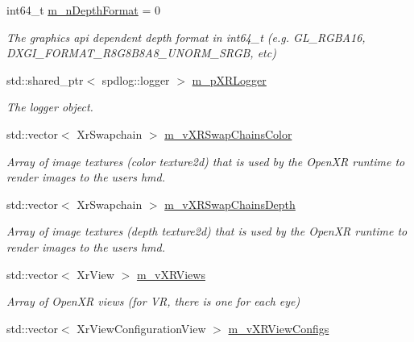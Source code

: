 \begin{DoxyCompactItemize}
int64\+\_\+t \mbox{\hyperlink{class_open_x_r_provider_1_1_x_r_render_manager_a103132b67fa308994833d7f4b3d874d7}{m\+\_\+n\+Depth\+Format}} = 0
\begin{DoxyCompactList}\small\item\em The graphics api dependent depth format in int64\+\_\+t (e.\+g. G\+L\+\_\+\+R\+G\+B\+A16, D\+X\+G\+I\+\_\+\+F\+O\+R\+M\+A\+T\+\_\+\+R8\+G8\+B8\+A8\+\_\+\+U\+N\+O\+R\+M\+\_\+\+S\+R\+GB, etc) \end{DoxyCompactList}\item 
std\+::shared\+\_\+ptr$<$ spdlog\+::logger $>$ \mbox{\hyperlink{class_open_x_r_provider_1_1_x_r_render_manager_a44e874b027aa24d211fcdf6cde2d1b28}{m\+\_\+p\+X\+R\+Logger}}
\begin{DoxyCompactList}\small\item\em The logger object. \end{DoxyCompactList}\item 
std\+::vector$<$ Xr\+Swapchain $>$ \mbox{\hyperlink{class_open_x_r_provider_1_1_x_r_render_manager_a6cbe21e466e02dcf45fefe062aed4c9f}{m\+\_\+v\+X\+R\+Swap\+Chains\+Color}}
\begin{DoxyCompactList}\small\item\em Array of image textures (color texture2d) that is used by the Open\+XR runtime to render images to the user\textquotesingle{}s hmd. \end{DoxyCompactList}\item 
std\+::vector$<$ Xr\+Swapchain $>$ \mbox{\hyperlink{class_open_x_r_provider_1_1_x_r_render_manager_a438d088335da03c2c642a98af34b9f1f}{m\+\_\+v\+X\+R\+Swap\+Chains\+Depth}}
\begin{DoxyCompactList}\small\item\em Array of image textures (depth texture2d) that is used by the Open\+XR runtime to render images to the user\textquotesingle{}s hmd. \end{DoxyCompactList}\item 
std\+::vector$<$ Xr\+View $>$ \mbox{\hyperlink{class_open_x_r_provider_1_1_x_r_render_manager_a25d5a9b0e65ff354082281d11cfe6bf3}{m\+\_\+v\+X\+R\+Views}}
\begin{DoxyCompactList}\small\item\em Array of Open\+XR views (for VR, there is one for each eye) \end{DoxyCompactList}\item 
std\+::vector$<$ Xr\+View\+Configuration\+View $>$ \mbox{\hyperlink{class_open_x_r_provider_1_1_x_r_render_manager_a87a36cbfba8e5d2d733b47b1e0bb6558}{m\+\_\+v\+X\+R\+View\+Configs}}

\end{DoxyCompactItemize}
